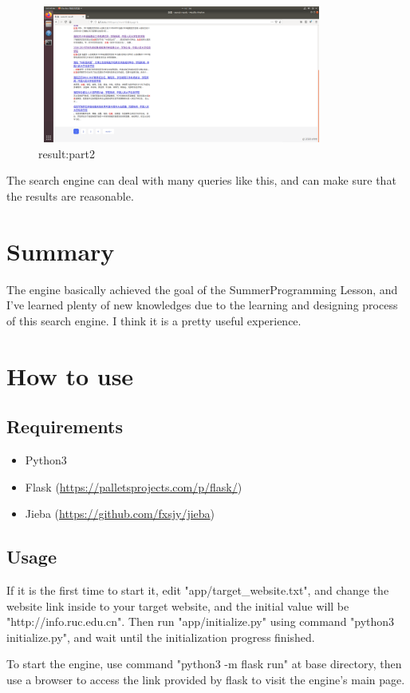 \documentclass[a4paper]{article}
\begin{document}
\begin{figure}[H]
\centering
\includegraphics[height=4.5cm,width=9.5cm]{2.png}
\caption{result:part2}
\label{2}
\end{figure}

The search engine can deal with many queries like this, and can make sure that the results are reasonable. 

\section{Summary}

The engine basically achieved the goal of the SummerProgramming Lesson, and I've learned plenty of new knowledges due to the learning and designing process of this search engine. I think it is a pretty useful experience.

\section{How to use}

\subsection{Requirements}

\begin{itemize}
\item Python3
\item Flask (\url{https://palletsprojects.com/p/flask/})
\item Jieba (\url{https://github.com/fxsjy/jieba})
\end{itemize}

\subsection{Usage}

If it is the first time to start it, edit "app/target\_website.txt", and change the website link inside to your target website, and the initial value will be "http://info.ruc.edu.cn". Then run "app/initialize.py" using command "python3 initialize.py", and wait until the initialization progress finished.

To start the engine, use command "python3 -m flask run" at base directory, then use a browser to access the link provided by flask to visit the engine's main page.
\end{document}
